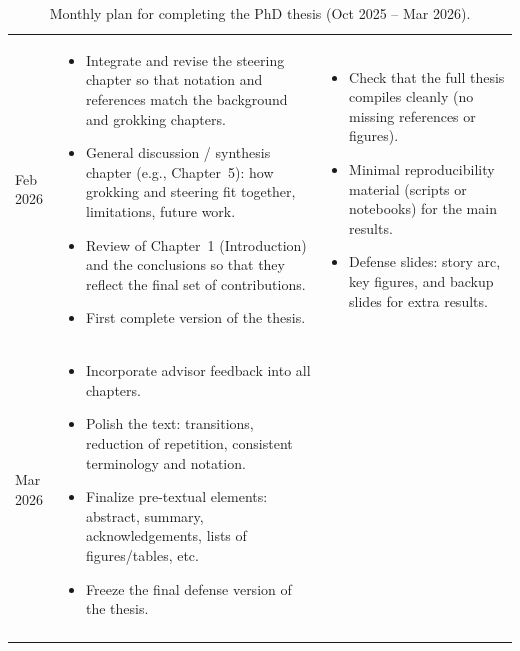 \documentclass[../../infufrgs/ppgc-prop-tese.tex]{subfiles}
\begin{document}
\begin{longtable}{p{}p{}p{}}
Feb 2026 &
\begin{itemize}
  \item Integrate and revise the steering chapter so that notation and references match the background and grokking chapters.
  \item General discussion / synthesis chapter (e.g., Chapter~5): how grokking and steering fit together, limitations, future work.
  \item Review of Chapter~1 (Introduction) and the conclusions so that they reflect the final set of contributions.
  \item First complete version of the thesis.
\end{itemize}
&
\begin{itemize}
  \item Check that the full thesis compiles cleanly (no missing references or figures).
  \item Minimal reproducibility material (scripts or notebooks) for the main results.
  \item Defense slides: story arc, key figures, and backup slides for extra results.
\end{itemize}
\\

Mar 2026 &
\begin{itemize}
  \item Incorporate advisor feedback into all chapters.
  \item Polish the text: transitions, reduction of repetition, consistent terminology and notation.
  \item Finalize pre-textual elements: abstract, summary, acknowledgements, lists of figures/tables, etc.
  \item Freeze the final defense version of the thesis.
\end{itemize}
&

\\
\hline
\caption{Monthly plan for completing the PhD thesis (Oct 2025 -- Mar 2026).}
\end{longtable}
\end{document}
